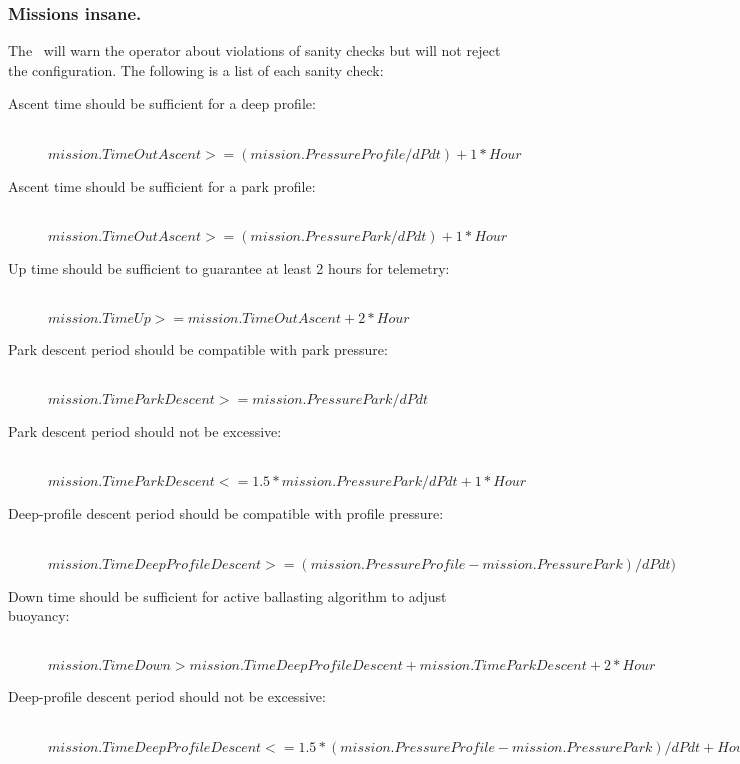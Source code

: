 \subsubsection{Missions insane.}

The \cs\ will warn the operator about violations of sanity checks but will not
reject the configuration.  The following is a list of each sanity check:

\begin{description}

\item[\textnormal{Ascent time should be sufficient for a deep profile:}]\ \\
  $mission.TimeOutAscent >= (mission.PressureProfile/dPdt) + 1*Hour$

\item[\textnormal{Ascent time should be sufficient for a park profile:}]\ \\
  $mission.TimeOutAscent >= (mission.PressurePark/dPdt) + 1*Hour$

\item[\textnormal{Up time should be sufficient to guarantee at least 2 hours for telemetry:}]\ \\
  $mission.TimeUp >= mission.TimeOutAscent + 2*Hour$

\item[\textnormal{Park descent period should be compatible with park pressure:}]\ \\
  $mission.TimeParkDescent >= mission.PressurePark/dPdt$

\item[\textnormal{Park descent period should not be excessive:}]\ \\
  $mission.TimeParkDescent <= 1.5*mission.PressurePark/dPdt + 1*Hour$

\item[\textnormal{Deep-profile descent period should be compatible with profile pressure:}]\ \\
  $mission.TimeDeepProfileDescent >= (mission.PressureProfile-mission.PressurePark)/dPdt)$

\item[\textnormal{Down time should be sufficient for active ballasting algorithm to adjust buoyancy:}]\ \\
  \mbox{$mission.TimeDown > mission.TimeDeepProfileDescent + mission.TimeParkDescent + 2*Hour$}

\item[\textnormal{Deep-profile descent period should not be excessive:}]\ \\
  \mbox{$mission.TimeDeepProfileDescent <= 1.5*(mission.PressureProfile-mission.PressurePark)/dPdt + Hour$}


\end{description}
